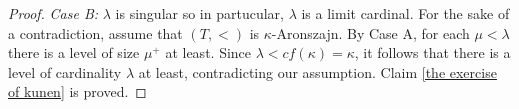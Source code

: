 \documentclass[11pt]{amsart}
\theoremstyle{plain}
\newtheorem{lemma}[theorem]{Lemma}
\theoremstyle{definition} %
\newtheorem{definition}[theorem]{Definition}
\theoremstyle{remark}
\begin{document}
\begin{proof}
\emph{Case B:} $\lambda$ is singular so in partucular, $\lambda$ is a limit cardinal. For the sake of a contradiction, assume that $(T,<)$ is $\kappa$-Aronszajn. By Case A, for each $\mu<\lambda$ there is a level of size $\mu^+$ at least. Since $\lambda<cf(\kappa)=\kappa$, it follows that there is a level of cardinality $\lambda$ at least, contradicting our assumption. Claim \ref{the exercise of kunen} is proved.
\end{proof}

\end{document}
